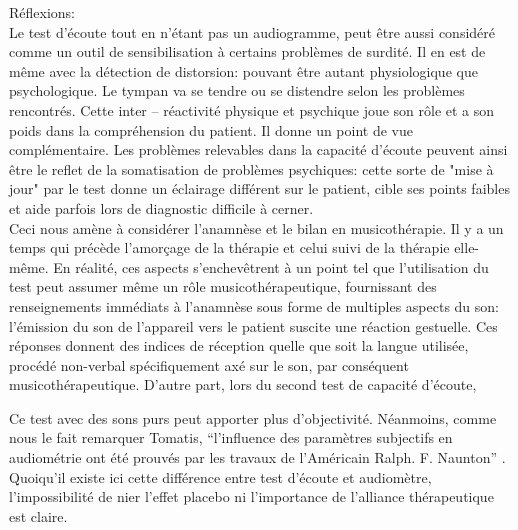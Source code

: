 \begin{itemize}
 Réflexions:
  \\
 Le test d'écoute tout en n'étant pas un audiogramme,  peut  être aussi considéré comme un 
 outil de sensibilisation à certains problèmes de surdité. Il en est de même avec la détection de distorsion:
 pouvant être autant physiologique que psychologique. Le tympan va se tendre ou se 
 distendre 
 selon les problèmes rencontrés. Cette inter -- réactivité physique et psychique joue son rôle et a son 
 poids dans la compréhension du patient. Il donne un point de vue complémentaire.
  Les problèmes relevables dans la capacité d'écoute peuvent ainsi être  le reflet de la somatisation de 
 problèmes psychiques: 
 cette sorte de  "mise  à jour" par le test donne un éclairage différent sur le patient, cible ses points 
 faibles et aide 
 parfois lors de diagnostic difficile à cerner.
  \\
  Ceci nous amène à considérer  l'anamnèse et le bilan en musicothérapie.
 Il y a un temps qui
 précède
 l'amorçage de la thérapie et celui suivi de la thérapie elle-même.
 En réalité, ces aspects s'enchevêtrent à un point tel que
 l'utilisation du test peut assumer même un rôle musicothérapeutique, fournissant des
 renseignements immédiats à l'anamnèse sous forme de multiples
 aspects du son: l'émission du son de
 l'appareil vers le patient suscite une  réaction gestuelle.  Ces réponses  
 donnent des indices de réception %
 quelle que soit la langue utilisée, procédé non-verbal
 	spécifiquement axé sur le son, par conséquent  musicothérapeutique. 
 	D'autre part, lors du second test de capacité d'écoute, 
 
Ce test avec des sons purs peut apporter plus d'objectivité. Néanmoins, comme nous le fait remarquer 
Tomatis,
\enquote{l'influence des paramètres subjectifs en audiométrie ont été prouvés par les travaux de 
	l'Américain Ralph. F. Naunton}  \autocite [69]{tomatisoreilletvie}. Quoiqu'il existe ici cette différence 
entre 
test d'écoute et audiomètre,
l'impossibilité  de nier l'effet placebo ni l'importance de  
l'alliance 
thérapeutique est claire.


\end{itemize}
